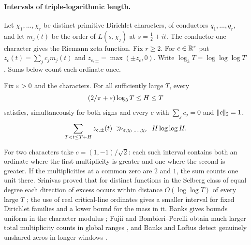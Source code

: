 \paragraph{Intervals of triple-logarithmic length.}
Let $\chi_1,\dots,\chi_r$ be distinct primitive Dirichlet characters, of conductors
$q_1,\dots,q_r$, and let $m_j(t)$ be the order of $L(s,\chi_j)$ at $s=\tfrac12+it$. The
conductor-one character gives the Riemann zeta function. Fix $r\ge2$. For $c\in\mathbb{R}^r$ put
$z_c(t)=\sum_jc_jm_j(t)$ and $z_{c,\pm}=\max(\pm z_c,0)$. Write
$\log_3T=\log\log\log T$. Sums below count each ordinate once.

\begin{theorem}[\stG]\label{zer:thm:short}
Fix $\varepsilon>0$ and the characters. For all sufficiently large $T$, every
\[
 (2/\pi+\varepsilon)\log_3T\le H\le T
\]
satisfies, simultaneously for both signs and every $c$ with $\sum_jc_j=0$ and
$\lVert c\rVert_2=1$,
\[
 \sum_{T<t\le T+H}z_{c,\pm}(t)\ \gg_{\eps,\chi_1,\dots,\chi_r}\ H\log\log H .
\]
\end{theorem}

For two characters take $c=(1,-1)/\sqrt2$: each such interval contains both an ordinate
where the first multiplicity is greater and one where the second is greater. If the
multiplicities at a common zero are $2$ and $1$, the sum counts one unit there. Srinivas
proved that for distinct functions in the Selberg class of equal degree each direction of
excess occurs within distance $O(\log\log T)$ of every large $T$ \cite{Srinivas2002Distinct};
the use of real critical-line ordinates gives a smaller interval for fixed Dirichlet
families and a lower bound for the mass in it. Banks gives bounds uniform in the character
modulus \cite{Banks2023Comparing}; Fujii and Bombieri--Perelli obtain much larger total
multiplicity counts in global ranges \cite{Fujii1976Zeros,BombieriPerelli1998Distinct}, and
Banks and Loftus detect genuinely unshared zeros in longer windows
\cite{BanksLoftus2026Unshared}.

